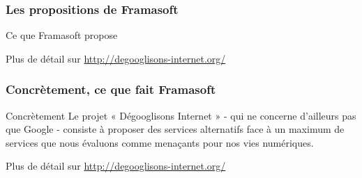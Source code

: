 \documentclass{beamer}
\begin{document}
\begin{frame}
\frametitle{Les propositions de Framasoft}

\begin{block}{Ce que Framasoft propose}
\end{block}
Plus de détail sur \url{http://degooglisons-internet.org/}
\end{frame}

\begin{frame}
\frametitle{Concrètement, ce que fait Framasoft}

\begin{block}{Concrètement}
Le projet « Dégooglisons Internet » - qui ne concerne d'ailleurs pas que Google - consiste à proposer des services alternatifs face à un maximum de services que nous évaluons comme menaçants pour nos vies numériques.
\end{block}
Plus de détail sur \url{http://degooglisons-internet.org/}
\end{frame}
\end{document}
